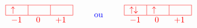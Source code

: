 \[ 
    \textcolor{red}{
        \begin{array}{c c c}
            \begin{array}{c}
                \begin{tabular}{|m{0.5cm}|m{0.5cm}|m{0.5cm}|}
                    \hline
                    $\uparrow$ &  &  \\
                    \hline
                \end{tabular} \\
                \begin{tabular}{m{0.5cm} m{0.5cm} m{0.5cm}}
                    $-1$ & \text{ 0 } & $+1$
                \end{tabular}
            \end{array}
             & 
            \quad \text{\textcolor{blue}{ou}} \quad
             & 
            \begin{array}{c}
                \begin{tabular}{|m{0.5cm}|m{0.5cm}|m{0.5cm}|}
                    \hline
                    $\uparrow \downarrow$ & $\uparrow$ &  \\
                    \hline
                \end{tabular} \\
                \begin{tabular}{m{0.5cm} m{0.5cm} m{0.5cm}}
                    $-1$ & \text{ 0 } & $+1$
                \end{tabular}
            \end{array}
        \end{array}
    }
\]
